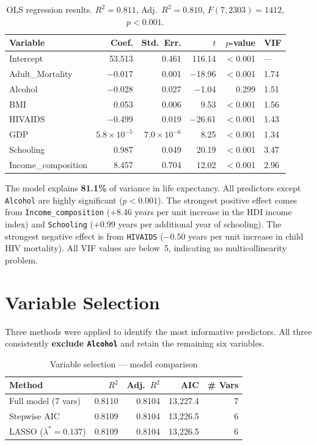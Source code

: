 \documentclass[11pt, a4paper]{article}
\begin{document}
\begin{table}[H]
\centering
\caption{OLS regression results. $R^2 = 0.811$, Adj.\ $R^2 = 0.810$, $F(7{,}2303) = 1412$, $p<0.001$.}
\label{tab:ols}
\small
\begin{tabular}{lrrrrl}
\toprule
\textbf{Variable} & \textbf{Coef.} & \textbf{Std.\ Err.} & \textbf{$t$} & \textbf{$p$-value} & \textbf{VIF}\\
\midrule
Intercept & 53.513 & 0.461 & 116.14 & $<$0.001 & —\\
Adult\_Mortality & $-$0.017 & 0.001 & $-$18.96 & $<$0.001 & 1.74\\
Alcohol & $-$0.028 & 0.027 & $-$1.04 & 0.299 & 1.51\\
BMI & 0.053 & 0.006 & 9.53 & $<$0.001 & 1.56\\
HIVAIDS & $-$0.499 & 0.019 & $-$26.61 & $<$0.001 & 1.43\\
GDP & $5.8\times10^{-5}$ & $7.0\times10^{-6}$ & 8.25 & $<$0.001 & 1.34\\
Schooling & 0.987 & 0.049 & 20.19 & $<$0.001 & 3.47\\
Income\_composition & 8.457 & 0.704 & 12.02 & $<$0.001 & 2.96\\
\bottomrule
\end{tabular}
\end{table}

The model explains \textbf{81.1\%} of variance in life expectancy.
All predictors except \texttt{Alcohol} are highly significant ($p < 0.001$).
The strongest positive effect comes from \texttt{Income\_composition} (+8.46 years
per unit increase in the HDI income index) and \texttt{Schooling} (+0.99 years per
additional year of schooling). The strongest negative effect is from \texttt{HIVAIDS}
($-0.50$ years per unit increase in child HIV mortality).
All VIF values are below~5, indicating no multicollinearity problem.

\section{Variable Selection}

Three methods were applied to identify the most informative predictors.
All three consistently \textbf{exclude \texttt{Alcohol}} and retain the remaining six variables.

\begin{table}[H]
\centering
\caption{Variable selection — model comparison}
\label{tab:varsel}
\small
\begin{tabular}{lrrrr}
\toprule
\textbf{Method} & \textbf{$R^2$} & \textbf{Adj.\ $R^2$} & \textbf{AIC} & \textbf{\# Vars}\\
\midrule
Full model (7 vars) & 0.8110 & 0.8104 & 13{,}227.4 & 7\\
Stepwise AIC & 0.8109 & 0.8104 & 13{,}226.5 & 6\\
LASSO ($\lambda^* = 0.137$) & 0.8109 & 0.8104 & 13{,}226.5 & 6\\
\bottomrule
\end{tabular}
\end{table}
\end{document}
